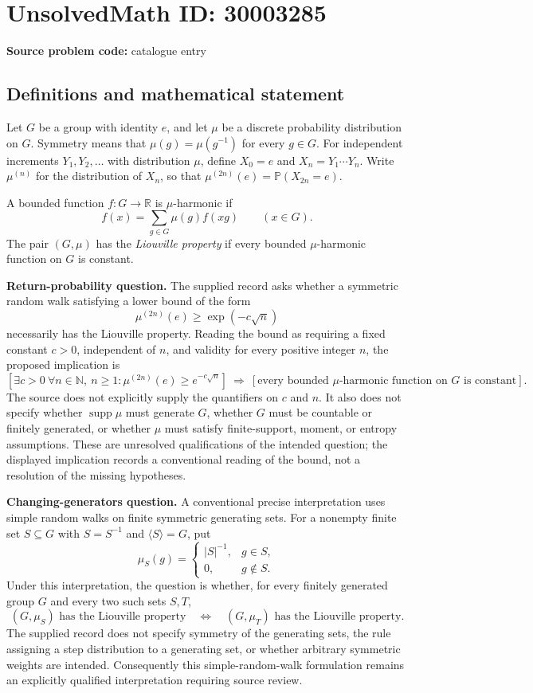 \documentclass[11pt]{article}
\newcommand{\N}{\mathbb{N}}
\newcommand{\R}{\mathbb{R}}
\begin{document}
\section*{UnsolvedMath ID: 30003285}
\textbf{Source problem code:} catalogue entry
\subsection{Definitions and mathematical statement}
Let \(G\) be a group with identity \(e\), and let \(\mu\) be a discrete probability distribution on \(G\). Symmetry means that \(\mu(g)=\mu(g^{-1})\) for every \(g\in G\). For independent increments \(Y_1,Y_2,\ldots\) with distribution \(\mu\), define \(X_0=e\) and \(X_n=Y_1\cdots Y_n\). Write \(\mu^{(n)}\) for the distribution of \(X_n\), so that \(\mu^{(2n)}(e)=\mathbb P(X_{2n}=e)\).

A bounded function \(f:G\to\R\) is \(\mu\)-harmonic if
\[
 f(x)=\sum_{g\in G}\mu(g)f(xg)\qquad(x\in G).
\]
The pair \((G,\mu)\) has the \emph{Liouville property} if every bounded \(\mu\)-harmonic function on \(G\) is constant.

\textbf{Return-probability question.} The supplied record asks whether a symmetric random walk satisfying a lower bound of the form
\[
 \mu^{(2n)}(e)\geq \exp(-c\sqrt n)
\]
necessarily has the Liouville property. Reading the bound as requiring a fixed constant \(c>0\), independent of \(n\), and validity for every positive integer \(n\), the proposed implication is
\[
 \left[\exists c>0\ \forall n\in\N,\ n\geq1:
 \mu^{(2n)}(e)\geq e^{-c\sqrt n}\right]
 \ \Longrightarrow\ 
 \left[\text{every bounded \(\mu\)-harmonic function on \(G\) is constant}\right].
\]
The source does not explicitly supply the quantifiers on \(c\) and \(n\). It also does not specify whether \(\operatorname{supp}\mu\) must generate \(G\), whether \(G\) must be countable or finitely generated, or whether \(\mu\) must satisfy finite-support, moment, or entropy assumptions. These are unresolved qualifications of the intended question; the displayed implication records a conventional reading of the bound, not a resolution of the missing hypotheses.

\textbf{Changing-generators question.} A conventional precise interpretation uses simple random walks on finite symmetric generating sets. For a nonempty finite set \(S\subseteq G\) with \(S=S^{-1}\) and \(\langle S\rangle=G\), put
\[
 \mu_S(g)=\begin{cases}|S|^{-1},&g\in S,\\0,&g\notin S.\end{cases}
\]
Under this interpretation, the question is whether, for every finitely generated group \(G\) and every two such sets \(S,T\),
\[
 (G,\mu_S)\text{ has the Liouville property}
 \quad\Longleftrightarrow\quad
 (G,\mu_T)\text{ has the Liouville property}.
\]
The supplied record does not specify symmetry of the generating sets, the rule assigning a step distribution to a generating set, or whether arbitrary symmetric weights are intended. Consequently this simple-random-walk formulation remains an explicitly qualified interpretation requiring source review.
\end{document}
